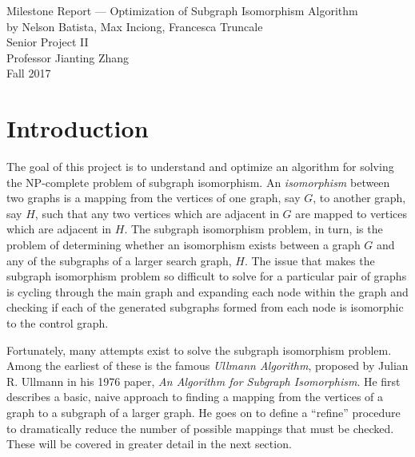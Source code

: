 \documentclass{article}
\begin{document}
\thispagestyle{empty}

\begin{titlepage}
  \vspace*{\fill} %
  \begin{center}
    {\Huge Milestone Report --- Optimization of Subgraph Isomorphism Algorithm}\\[0.4cm]
    {\huge by Nelson Batista, Max Inciong, Francesca Truncale}\\[0.5cm]
    {\huge Senior Project II}\\[0.4cm]
    {\huge Professor Jianting Zhang}\\[0.4cm]
    {\LARGE Fall 2017}
  \end{center}
  \vspace*{\fill}
\end{titlepage}

\tableofcontents

\newpage

\setcounter{page}{1}

\section{Introduction}

The goal of this project is to understand and optimize an algorithm for solving the NP-complete problem of subgraph isomorphism. An \textit{isomorphism} between two graphs is a mapping from the vertices of one graph, say $G$, to another graph, say $H$, such that any two vertices which are adjacent in $G$ are mapped to vertices which are adjacent in $H$. The subgraph isomorphism problem, in turn, is the problem of determining whether an isomorphism exists between a graph $G$ and any of the subgraphs of a larger search graph, $H$. The issue that makes the subgraph isomorphism problem so difficult to solve for a particular pair of graphs is cycling through the main graph and expanding each node within the graph and checking if each of the generated subgraphs formed from each node is isomorphic to the control graph.

Fortunately, many attempts exist to solve the subgraph isomorphism problem. Among the earliest of these is the famous \textit{Ullmann Algorithm}, proposed by Julian R. Ullmann in his 1976 paper, \textit{An Algorithm for Subgraph Isomorphism}. He first describes a basic, naive approach to finding a mapping from the vertices of a graph to a subgraph of a larger graph. He goes on to define a ``refine'' procedure to dramatically reduce the number of possible mappings that must be checked. These will be covered in greater detail in the next section.
\end{document}
